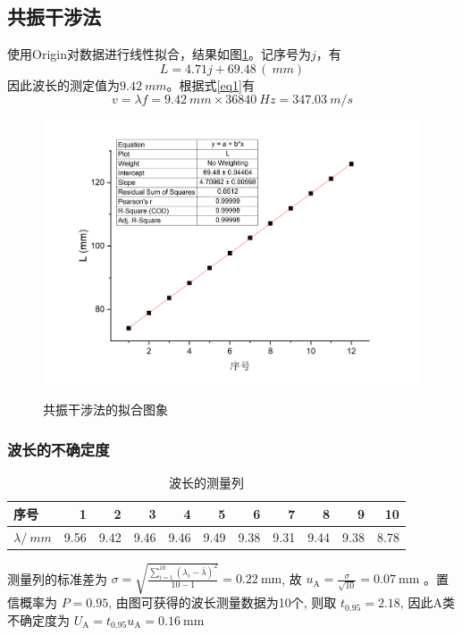 \documentclass{article}
\begin{document}
\subsection*{共振干涉法}
使用Origin对数据进行线性拟合，结果如图\ref{graph1}。记序号为$j$，有 
\[L=4.71j+69.48\,(\SI{}{mm})\]
因此波长的测定值为$\SI{9.42}{mm}$。根据式\eqref{eq1}有
\[v=\lambda f=\SI{9.42}{mm}\times \SI{36840}{Hz}=\SI{347.03}{m/s}\]

\begin{figure}[h]
    \centering
    \caption{共振干涉法的拟合图象}
    \includegraphics[scale=0.5]{graph1.png}
    \label{graph1}
\end{figure}


\subsubsection*{波长的不确定度}

\begin{table}[htbp]
    \centering
    \caption{波长的测量列}
      \begin{tabular}{|l|r|r|r|r|r|r|r|r|r|r|}
      \hline
      序号    & 1     & 2     & 3     & 4     & 5     & 6     & 7     & 8     & 9     & 10 \bigstrut\\
      \hline
      $\lambda/\SI{}{mm}$     & 9.56  & 9.42  & 9.46  & 9.46  & 9.49  & 9.38  & 9.31  & 9.44  & 9.38  & 8.78 \bigstrut\\
      \hline
      \end{tabular}%
    \label{tab:addlabel}%
  \end{table}%
  
  
测量列的标准差为 $\sigma=\sqrt{\frac{\sum_{i=1}^{10}\left(\lambda_i-\bar{\lambda}\right)^2}{10-1}}=0.22 \mathrm{~mm}$, 故 $u_{\mathrm{A}}=\frac{\sigma}{\sqrt{10}}=0.07 \mathrm{~mm}$ 。置信概率为 $P=0.95$, 由图可获得的波长测量数据为10个, 则取 $t_{0.95}=2.18$, 因此A类不确定度为 $U_{\mathrm{A}}=t_{0.95} u_{\mathrm{A}}=0.16 \mathrm{~mm}$
\end{document}
